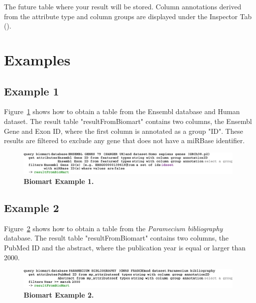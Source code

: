 The future table where your result will be stored. Column annotations derived from the attribute type and column groups are displayed under the Inspector Tab (\inspectorTabIcon).
\section{Examples}
\subsection{Example 1}
Figure~\ref{fig:BiomartExample1} shows how to obtain a table from the Ensembl database and Human dataset. The result table "resultFromBiomart" contains two columns, the Ensembl Gene and Exon ID, where the first column is annotated as a group "ID". These results are filtered to exclude any gene that does not have a miRBase identifier.

 \begin{figure}[h!tbp]
  \centering
  \includegraphics[width=\figWidthWide]{figures/BiomartExample1.pdf}
\caption[Biomart Example 1]{\textbf{ Biomart Example 1.}}
\label{fig:BiomartExample1}
\end{figure}

\subsection{Example 2}

Figure~\ref{fig:BiomartExample2} shows how to obtain a table from the \textit{Paramecium bibliography} database. The result table "resultFromBiomart" contains two columns, the PubMed ID and the abstract, where the publication year is equal or larger than 2000.

 \begin{figure}[h!tbp]
  \centering
  \includegraphics[width=\figWidthWide]{figures/BiomartExample2.pdf}
\caption[Biomart Example 2]{\textbf{ Biomart Example 2.}}
\label{fig:BiomartExample2}
\end{figure}


